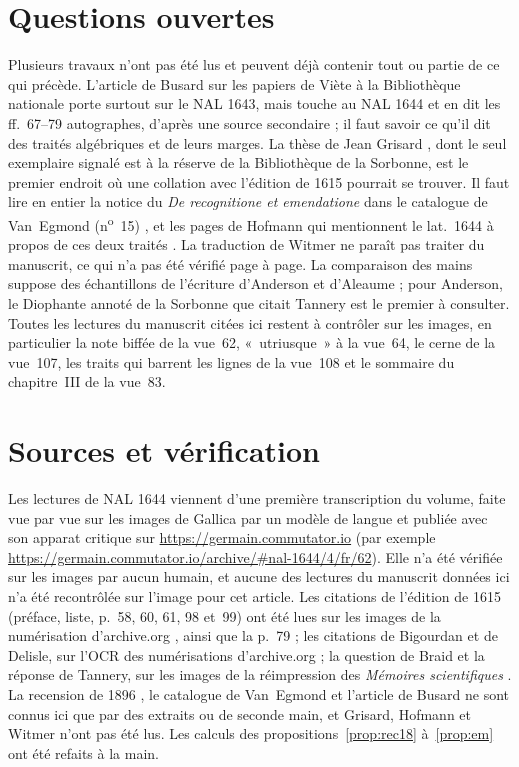 \documentclass[11pt,a4paper]{article}
\theoremstyle{remark}
\begin{document}
\section*{Questions ouvertes}

Plusieurs travaux n'ont pas été lus et peuvent déjà contenir tout ou
partie de ce qui précède. L'article de Busard sur les papiers de Viète à la
Bibliothèque nationale \cite{busard1964} porte surtout sur le NAL 1643,
mais touche au NAL 1644 et en dit les ff.~67--79 autographes, d'après une
source secondaire ; il faut savoir ce qu'il dit des traités algébriques et
de leurs marges. La thèse de Jean Grisard \cite{grisard1970}, dont le seul
exemplaire signalé est à la réserve de la Bibliothèque de la Sorbonne, est
le premier endroit où une collation avec l'édition de 1615 pourrait se
trouver. Il faut lire en entier la notice du \emph{De recognitione et
emendatione} dans le catalogue de Van~Egmond (n\textsuperscript{o}~15)
\cite{vanegmond1985}, et les pages de Hofmann qui mentionnent le
lat.~1644 à propos de ces deux traités \cite{hofmann1962}. La traduction
de Witmer \cite{witmer1983} ne paraît pas traiter du manuscrit, ce qui n'a
pas été vérifié page à page. La comparaison des mains suppose des
échantillons de l'écriture d'Anderson et d'Aleaume ; pour Anderson, le
Diophante annoté de la Sorbonne que citait Tannery est le premier à
consulter. Toutes les lectures du manuscrit citées ici restent à
contrôler sur les images, en particulier la note biffée de la vue~62,
«~utriusque~» à la vue~64, le cerne de la vue~107, les traits qui barrent
les lignes de la vue~108 et le sommaire du chapitre~III de la vue~83.

\section*{Sources et vérification}

Les lectures de NAL 1644 viennent d'une première transcription du volume,
faite vue par vue sur les images de Gallica par un modèle de langue et
publiée avec son apparat critique sur \url{https://germain.commutator.io}
(par exemple \url{https://germain.commutator.io/archive/#nal-1644/4/fr/62}).
Elle n'a été vérifiée sur les images par aucun humain, et aucune des lectures
du manuscrit données ici n'a été recontrôlée sur l'image pour cet article.
Les citations de l'édition de 1615 (préface, liste, p.~58, 60, 61, 98
et~99) ont été lues sur les images de la numérisation d'archive.org
\cite{anderson1615}, ainsi que la p.~79 ; les citations de Bigourdan et de
Delisle, sur l'OCR des numérisations d'archive.org ; la question de Braid et
la réponse de Tannery, sur les images de la réimpression des
\emph{Mémoires scientifiques} \cite{tannery1902}. La recension de 1896
\cite{tannery1896}, le catalogue de Van~Egmond \cite{vanegmond1985} et
l'article de Busard \cite{busard1964} ne sont connus ici que par des
extraits ou de seconde main, et Grisard, Hofmann et Witmer n'ont pas été
lus. Les calculs des propositions~\ref{prop:rec18}
à~\ref{prop:em} ont été refaits à la main.
\end{document}
